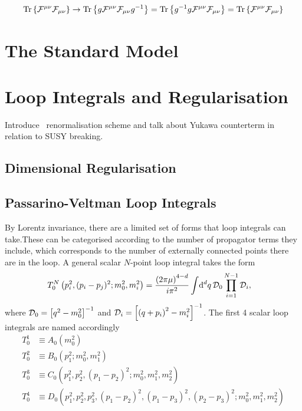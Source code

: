 \documentclass[../main.tex]{subfiles}
\begin{document}
\begin{temporary}
    \begin{equation}
        \operatorname{Tr}\left\{\mathcal{F}^{\mu\nu} \mathcal{F}_{\mu\nu}\right\} \to
        \operatorname{Tr}\left\{g \mathcal{F}^{\mu\nu} \mathcal{F}_{\mu\nu} g^{-1}\right\} =
        \operatorname{Tr}\left\{g^{-1} g \mathcal{F}^{\mu\nu} \mathcal{F}_{\mu\nu}\right\} =
        \operatorname{Tr}\left\{\mathcal{F}^{\mu\nu} \mathcal{F}_{\mu\nu}\right\}
    \end{equation}
\end{temporary}

\section{The Standard Model}

\section{Loop Integrals and Regularisation}
\begin{TODO}
    \item Introduce \DRbar\ renormalisation scheme and talk about Yukawa
    counterterm in
    relation to SUSY breaking.
\end{TODO}

\subsection{Dimensional Regularisation}

\subsection{Passarino-Veltman Loop Integrals}
By Lorentz invariance, there are a limited set of forms that loop integrals
can
take. These can be categorised according to the number
of propagator terms they include, which corresponds to the number of externally
connected points there are in the loop. A general scalar \(N\)-point loop
integral takes the form
\begin{align}
    T^N_0\left(p_i^2, (p_i-p_j)^2; m_0^2, m_i^2\right) & = \frac{\left(2\pi
            \mu\right)^{4-d}}{i \pi^2} \int \!\mathrm{d}^d q\, \mathcal{D}_0
    \prod_{i=1}^{N-1}
    \mathcal{D}_i,
\end{align}
where \(\mathcal{D}_0 = \left[q^2-m_0^2\right]^{-1}\) and \(\mathcal{D}_i =
\left[\left(q+p_i\right)^2-m_i^2\right]^{-1}\).
The first 4 scalar loop integrals are named accordingly
\begin{align}
    T^1_0 & \equiv A_0(m_0^2)
    \\
    T^2_0 & \equiv B_0(p_1^2; m_0^2, m_1^2)
    \\
    T^3_0 & \equiv C_0(p_1^2, p_2^2, (p_1-p_2)^2; m_0^2, m_1^2, m_2^2)
    \\
    T^4_0 & \equiv D_0(p_1^2, p_2^2, p_3^2, (p_1-p_2)^2, (p_1-p_3)^2,
    (p_2-p_3)^2; m_0^2, m_1^2, m_2^2)
\end{align}
\end{document}
